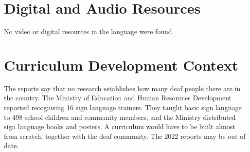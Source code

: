 \documentclass[12pt]{article}
\begin{document}
\section{Digital and Audio Resources}
No video or digital resources in the language were found.

\section{Curriculum Development Context}
The reports say that no research establishes how many deaf people there are in the country. The Ministry of Education and Human Resources Development reported recognising 16 sign language trainers. They taught basic sign language to 498 school children and community members, and the Ministry distributed sign language books and posters. A curriculum would have to be built almost from scratch, together with the deaf community. The 2022 reports may be out of date.
\end{document}
